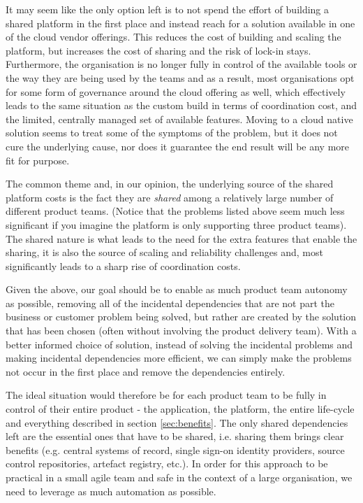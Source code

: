 \documentclass[reprint,amsmath,amssymb,aps]{revtex4-1}
\begin{document}
It may seem like the only option left is to not spend the effort of building a shared platform in the first place and instead reach for a solution available in one of the cloud vendor offerings. This reduces the cost of building and scaling the platform, but increases the cost of sharing and the risk of lock-in stays. Furthermore, the organisation is no longer fully in control of the available tools or the way they are being used by the teams and as a result, most organisations opt for some form of governance around the cloud offering as well, which effectively leads to the same situation as the custom build in terms of coordination cost, and the limited, centrally managed set of available features. Moving to a cloud native solution seems to treat some of the symptoms of the problem, but it does not cure the underlying cause, nor does it guarantee the end result will be any more fit for purpose.

The common theme and, in our opinion, the underlying source of the shared platform costs is the fact they are \textit{shared} among a relatively large number of different product teams. (Notice that the problems listed above seem much less significant if you imagine the platform is only supporting three product teams). The shared nature is what leads to the need for the extra features that enable the sharing, it is also the source of scaling and reliability challenges and, most significantly leads to a sharp rise of coordination costs.

Given the above, our goal should be to enable as much product team autonomy as possible, removing all of the incidental dependencies that are not part the business or customer problem being solved, but rather are created by the solution that has been chosen (often without involving the product delivery team). With a better informed choice of solution, instead of solving the incidental problems and making incidental dependencies more efficient, we can simply make the problems not occur in the first place and remove the dependencies entirely.

The ideal situation would therefore be for each product team to be fully in control of their entire product - the application, the platform, the entire life-cycle and everything described in section \ref{sec:benefits}. The only shared dependencies left are the essential ones that have to be shared, i.e. sharing them brings clear benefits (e.g. central systems of record, single sign-on identity providers, source control repositories, artefact registry, etc.). In order for this approach to be practical in a small agile team and safe in the context of a large organisation, we need to leverage as much automation as possible.
\end{document}
